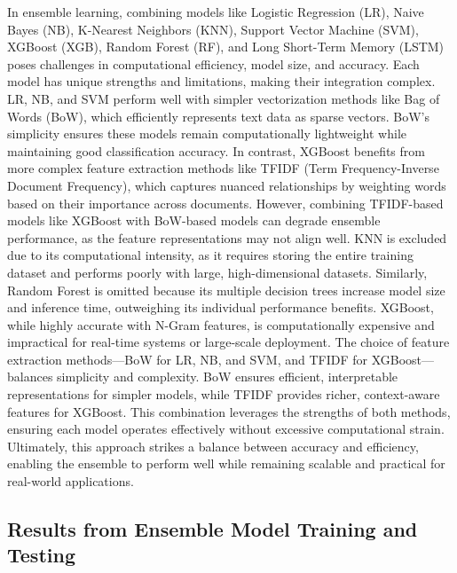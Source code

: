 \noindent
In ensemble learning, combining models like Logistic Regression (LR), Naive Bayes (NB), K-Nearest Neighbors (KNN), Support Vector Machine (SVM), XGBoost (XGB), Random Forest (RF), and Long Short-Term Memory (LSTM) poses challenges in computational efficiency, model size, and accuracy. Each model has unique strengths and limitations, making their integration complex. LR, NB, and SVM perform well with simpler vectorization methods like Bag of Words (BoW), which efficiently represents text data as sparse vectors. BoW’s simplicity ensures these models remain computationally lightweight while maintaining good classification accuracy. In contrast, XGBoost benefits from more complex feature extraction methods like TFIDF (Term Frequency-Inverse Document Frequency), which captures nuanced relationships by weighting words based on their importance across documents. However, combining TFIDF-based models like XGBoost with BoW-based models can degrade ensemble performance, as the feature representations may not align well. KNN is excluded due to its computational intensity, as it requires storing the entire training dataset and performs poorly with large, high-dimensional datasets. Similarly, Random Forest is omitted because its multiple decision trees increase model size and inference time, outweighing its individual performance benefits. XGBoost, while highly accurate with N-Gram features, is computationally expensive and impractical for real-time systems or large-scale deployment. The choice of feature extraction methods—BoW for LR, NB, and SVM, and TFIDF for XGBoost—balances simplicity and complexity. BoW ensures efficient, interpretable representations for simpler models, while TFIDF provides richer, context-aware features for XGBoost. This combination leverages the strengths of both methods, ensuring each model operates effectively without excessive computational strain. Ultimately, this approach strikes a balance between accuracy and efficiency, enabling the ensemble to perform well while remaining scalable and practical for real-world applications.
\pagebreak

\subsection{Results from Ensemble Model Training and Testing}

